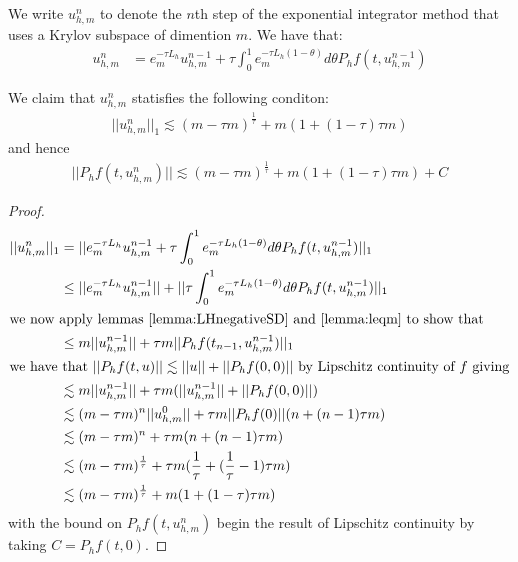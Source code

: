 \begin{definition}
    We write $u_{h,m}^n$ to denote the $n$th step of the exponential integrator method that uses a Krylov subspace of dimention $m$.
    We have that:
    \begin{align*}
        u_{h,m}^n &= e_m^{-\tau L_h} u_{h,m}^{n-1} + \tau \int^1_0e_m^{-\tau L_h(1-\theta)}d\theta P_hf(t, u_{h,m}^{n-1})
    \end{align*}
\end{definition}

\begin{lemma}
    We claim that $u_{h,m}^n$ statisfies the following conditon:
    \begin{align*}
        ||u_{h,m}^n||_1 \lesssim (m-\tau m)^\frac{1}{\tau} + m (1 + (1 - \tau)\tau m)
    \end{align*}
    and hence
    \begin{align*}
        ||P_hf(t,u_{h,m}^n)|| \lesssim (m-\tau m)^\frac{1}{\tau} + m (1 + (1 - \tau)\tau m) + C
    \end{align*}
\end{lemma}
\begin{proof}
    \begin{align*}
        ||u_{h,m}^n||_1 &= ||e_m^{-\tau L_h}u_{h,m}^{n-1} + \tau \int^1_0e_m^{-\tau L_h(1-\theta)}d\theta P_hf(t, u_{h,m}^{n-1})||_1\\
        &\leq ||e_m^{-\tau L_h}u_{h,m}^{n-1}|| + ||\tau \int^1_0e_m^{-\tau L_h(1-\theta)}d\theta P_hf(t, u_{h,m}^{n-1})||_1\\
        \intertext{we now apply lemmas \ref{lemma:LHnegativeSD} and \ref{lemma:leqm} to show that}
        &\leq m||u_{h,m}^{n-1}|| + \tau m ||P_hf(t_{n-1},u_{h,m}^{n-1})||_1\\
        \intertext{we have that $||P_hf(t,u)|| \lesssim ||u||+||P_hf(0,0)||$ by Lipschitz continuity of $f$ giving}
        &\lesssim m||u_{h,m}^{n-1}|| + \tau m (||u_{h,m}^{n-1}|| + ||P_hf(0,0)||)\\
        &\lesssim (m-\tau m)^n||u_{h,m}^0|| + \tau m ||P_hf(0)||(n + (n -1)\tau m)\\
        &\lesssim (m-\tau m)^n + \tau m (n + (n -1)\tau m)\\
        &\lesssim (m-\tau m)^\frac{1}{\tau} + \tau m (\frac{1}{\tau} + (\frac{1}{\tau} -1)\tau m)\\
        &\lesssim (m-\tau m)^\frac{1}{\tau} + m (1 + (1 - \tau)\tau m)
    \end{align*}
    with the bound on $P_hf(t,u_{h,m}^n)$ begin the result of Lipschitz continuity by taking $C=P_hf(t,0)$.
\end{proof}

